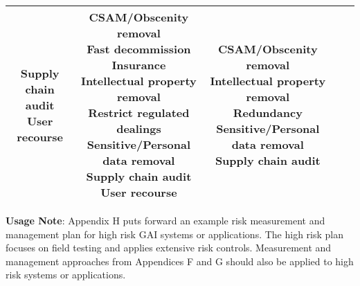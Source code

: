 \documentclass[fleqn]{article}
\begin{document}
\begin{landscape}
\begin{table}[H]
\begin{tabular}{|c|c|c|c|c|}
{			\textbullet\hspace{3pt} Supply chain audit \\ 	
			\textbullet\hspace{3pt} User recourse \\						 	 
		} 
		& \makecell[l]{
			\textbullet\hspace{3pt} CSAM/Obscenity removal \\ 	
			\textbullet\hspace{3pt} Fast decommission \\ 	
			\textbullet\hspace{3pt} Insurance \\ 	
			\textbullet\hspace{3pt} Intellectual property removal \\ 	
			\textbullet\hspace{3pt} Restrict regulated dealings \\ 	
			\textbullet\hspace{3pt} Sensitive/Personal data removal \\ 	
			\textbullet\hspace{3pt} Supply chain audit \\ 	
			\textbullet\hspace{3pt} User recourse \\  
		}
		& \makecell[l]{
			\textbullet\hspace{3pt} CSAM/Obscenity removal \\ 		
			\textbullet\hspace{3pt} Intellectual property removal \\ 	
			\textbullet\hspace{3pt} Redundancy \\ 		
			\textbullet\hspace{3pt} Sensitive/Personal data removal \\ 	
			\textbullet\hspace{3pt} Supply chain audit \\ 							 	 
		} 
		\\
		\hline
	\end{tabular}
	\label{table:high_risk_plan_by_gai_risk_cont2}
\end{table}

\noindent\textbf{Usage Note}: Appendix H puts forward an example risk measurement and management plan for high risk GAI systems or applications. The high risk plan focuses on field testing and applies extensive risk controls. Measurement and management approaches from Appendices F and G should also be applied to high risk systems or applications.


\end{landscape}
\end{document}
